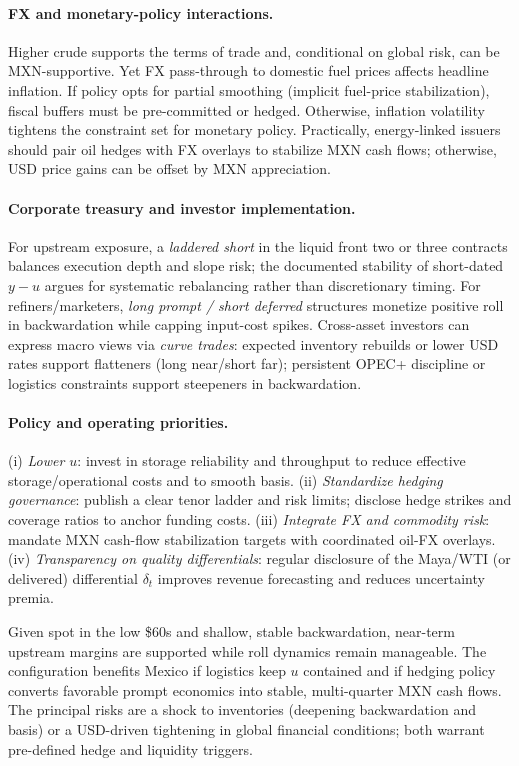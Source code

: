 \documentclass[11pt,a4paper]{article} %
\begin{document}
\paragraph{FX and monetary-policy interactions.}
Higher crude supports the terms of trade and, conditional on global risk, can be MXN-supportive. Yet FX pass-through to domestic fuel prices affects headline inflation. If policy opts for partial smoothing (implicit fuel-price stabilization), fiscal buffers must be pre-committed or hedged. Otherwise, inflation volatility tightens the constraint set for monetary policy. Practically, energy-linked issuers should pair oil hedges with FX overlays to stabilize MXN cash flows; otherwise, USD price gains can be offset by MXN appreciation.

\paragraph{Corporate treasury and investor implementation.}
For upstream exposure, a \emph{laddered short} in the liquid front two or three contracts balances execution depth and slope risk; the documented stability of short-dated \(y-u\) argues for systematic rebalancing rather than discretionary timing. For refiners/marketers, \emph{long prompt / short deferred} structures monetize positive roll in backwardation while capping input-cost spikes. Cross-asset investors can express macro views via \emph{curve trades}: expected inventory rebuilds or lower USD rates support flatteners (long near/short far); persistent OPEC+ discipline or logistics constraints support steepeners in backwardation.

\paragraph{Policy and operating priorities.}
(i) \emph{Lower \(u\)}: invest in storage reliability and throughput to reduce effective storage/operational costs and to smooth basis.  
(ii) \emph{Standardize hedging governance}: publish a clear tenor ladder and risk limits; disclose hedge strikes and coverage ratios to anchor funding costs.  
(iii) \emph{Integrate FX and commodity risk}: mandate MXN cash-flow stabilization targets with coordinated oil-FX overlays.  
(iv) \emph{Transparency on quality differentials}: regular disclosure of the Maya/WTI (or delivered) differential \(\delta_t\) improves revenue forecasting and reduces uncertainty premia.


Given spot in the low \$60s and shallow, stable backwardation, near-term upstream margins are supported while roll dynamics remain manageable. The configuration benefits Mexico if logistics keep \(u\) contained and if hedging policy converts favorable prompt economics into stable, multi-quarter MXN cash flows. The principal risks are a shock to inventories (deepening backwardation and basis) or a USD-driven tightening in global financial conditions; both warrant pre-defined hedge and liquidity triggers.
\end{document}

